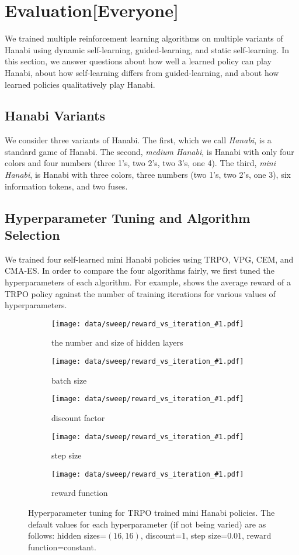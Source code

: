 \section{Evaluation[Everyone]}\label{sec:eval}

We trained multiple reinforcement learning algorithms on multiple variants of
Hanabi using dynamic self-learning, guided-learning, and static self-learning.
In this section, we answer questions about how well a learned policy can play
Hanabi, about how self-learning differs from guided-learning, and about how
learned policies qualitatively play Hanabi.

\subsection{Hanabi Variants}
We consider three variants of Hanabi. The first, which we call \emph{Hanabi},
is a standard game of Hanabi. The second, \emph{medium Hanabi}, is Hanabi with
only four colors and four numbers (three 1's, two 2's, two 3's, one 4). The
third, \emph{mini Hanabi}, is Hanabi with three colors, three numbers (two 1's,
two 2's, one 3), six information tokens, and two fuses.

\subsection{Hyperparameter Tuning and Algorithm Selection}
We trained four self-learned mini Hanabi policies using TRPO, VPG, CEM, and
CMA-ES. In order to compare the four algorithms fairly, we first tuned the
hyperparameters of each algorithm. For example,  shows the
average reward of a TRPO policy against the number of training iterations for
various values of hyperparameters.

\begin{figure}[ht]
  \newcommand{\hyperparamsubfig}[3]{%
    \begin{subfigure}[t]{0.32\textwidth}
      \centering
      \texttt{[image: data/sweep/reward\_vs\_iteration\_\#1.pdf]}
      \caption{#2}\label{fig:#3}
    \end{subfigure}
  }

  \centering

  \hyperparamsubfig{hidden_sizes}{the number and size of hidden layers}{}
  \hyperparamsubfig{batch_size}{batch size}{}
  \hyperparamsubfig{discount}{discount factor}{}

  \hyperparamsubfig{step_size}{step size}{}
  \hyperparamsubfig{reward}{reward function}{}

  \caption{
    Hyperparameter tuning for TRPO trained mini Hanabi policies. The default
    values for each hyperparameter (if not being varied) are as follows: hidden
    sizes=$(16, 16)$, discount=$1$, step size=$0.01$, reward function=constant.
  }\label{fig:trpo-tuning}
\end{figure}

